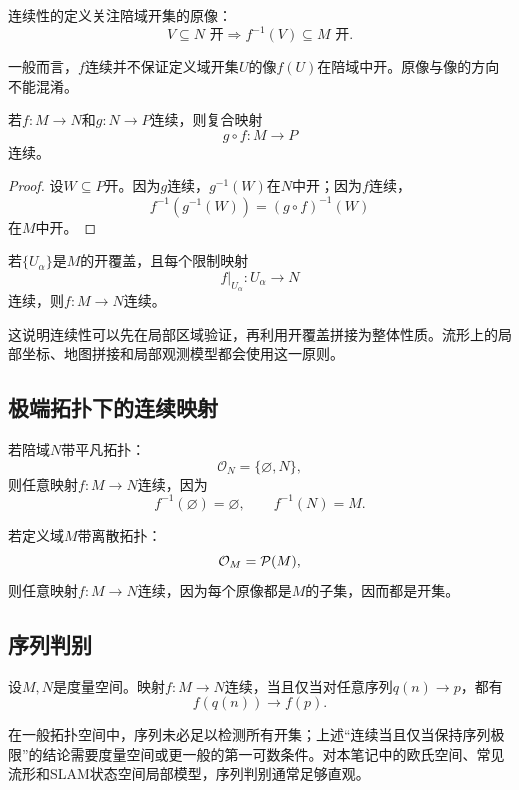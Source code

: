 连续性的定义关注陪域开集的原像：
\[
    \boxed{
    V\subseteq N\text{ 开}
    \Longrightarrow
    f^{-1}(V)\subseteq M\text{ 开}.
    }
\]

一般而言，$f$连续并不保证定义域开集$U$的像$f(U)$在陪域中开。原像与像的方向不能混淆。

\begin{theorem}[连续复合]
若$f:M\to N$和$g:N\to P$连续，则复合映射
\[
    g\circ f:M\to P
\]
连续。
\end{theorem}

\begin{proof}
设$W\subseteq P$开。因为$g$连续，$g^{-1}(W)$在$N$中开；因为$f$连续，
\[
    f^{-1}(g^{-1}(W))
    =
    (g\circ f)^{-1}(W)
\]
在$M$中开。
\end{proof}

\begin{proposition}[连续性的局部性]
若$\{U_\alpha\}$是$M$的开覆盖，且每个限制映射
\[
    f\vert_{U_\alpha}:U_\alpha\to N
\]
连续，则$f:M\to N$连续。
\end{proposition}

这说明连续性可以先在局部区域验证，再利用开覆盖拼接为整体性质。流形上的局部坐标、地图拼接和局部观测模型都会使用这一原则。

\subsection{极端拓扑下的连续映射}

若陪域$N$带平凡拓扑：
\[
    \mathcal O_N=\{\varnothing,N\},
\]
则任意映射$f:M\to N$连续，因为
\[
    f^{-1}(\varnothing)=\varnothing,
    \qquad
    f^{-1}(N)=M.
\]

若定义域$M$带离散拓扑：
\[
    \mathcal O_M=\P(M),
\]
则任意映射$f:M\to N$连续，因为每个原像都是$M$的子集，因而都是开集。

\subsection{序列判别}

\begin{theorem}[度量空间中的序列判别]
设$M,N$是度量空间。映射$f:M\to N$连续，当且仅当对任意序列$q(n)\to p$，都有
\[
    f(q(n))\to f(p).
\]
\end{theorem}

在一般拓扑空间中，序列未必足以检测所有开集；上述“连续当且仅当保持序列极限”的结论需要度量空间或更一般的第一可数条件。对本笔记中的欧氏空间、常见流形和SLAM状态空间局部模型，序列判别通常足够直观。

